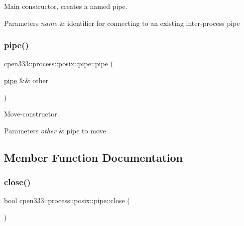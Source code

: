 Main constructor, creates a named pipe. 


\begin{DoxyParams}{Parameters}
{\em name} & identifier for connecting to an existing inter-\/process pipe \\
\hline
\end{DoxyParams}
\mbox{\label{classcpen333_1_1process_1_1posix_1_1pipe_a0ee8e36b323420d783fdbcf253225677}} 
\subsubsection{\texorpdfstring{pipe()}{pipe()}\hspace{0.1cm}{\footnotesize\ttfamily [2/2]}}
{\footnotesize\ttfamily cpen333\+::process\+::posix\+::pipe\+::pipe (\begin{DoxyParamCaption}\item[{\hyperlink{classcpen333_1_1process_1_1posix_1_1pipe}{pipe} \&\&}]{other }\end{DoxyParamCaption})\hspace{0.3cm}{\ttfamily [inline]}}



Move-\/constructor. 


\begin{DoxyParams}{Parameters}
{\em other} & pipe to move \\
\hline
\end{DoxyParams}


\subsection{Member Function Documentation}
\mbox{\label{classcpen333_1_1process_1_1posix_1_1pipe_af36dacdb81426f3dc76904bdcf1afc8f}} 
\subsubsection{\texorpdfstring{close()}{close()}}
{\footnotesize\ttfamily bool cpen333\+::process\+::posix\+::pipe\+::close (\begin{DoxyParamCaption}{ }\end{DoxyParamCaption})\hspace{0.3cm}{\ttfamily [inline]}}




